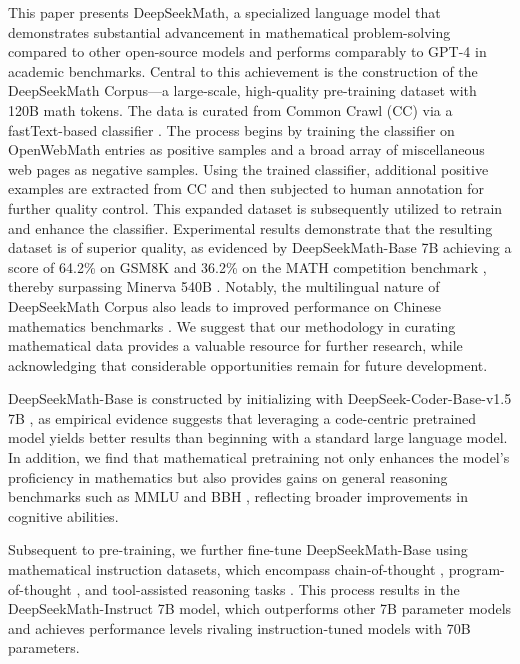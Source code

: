 This paper presents DeepSeekMath, a specialized language model that demonstrates substantial advancement in mathematical problem-solving compared to other open-source models and performs comparably to GPT-4 in academic benchmarks. Central to this achievement is the construction of the DeepSeekMath Corpus—a large-scale, high-quality pre-training dataset with 120B math tokens. The data is curated from Common Crawl (CC) via a fastText-based classifier \citep{joulin2016fasttext}. The process begins by training the classifier on OpenWebMath \citep{openwebmath} entries as positive samples and a broad array of miscellaneous web pages as negative samples. Using the trained classifier, additional positive examples are extracted from CC and then subjected to human annotation for further quality control. This expanded dataset is subsequently utilized to retrain and enhance the classifier. Experimental results demonstrate that the resulting dataset is of superior quality, as evidenced by DeepSeekMath-Base 7B achieving a score of 64.2\% on GSM8K \citep{gsm8k} and 36.2\% on the MATH competition benchmark \citep{MATH}, thereby surpassing Minerva 540B \citep{minerva}. Notably, the multilingual nature of DeepSeekMath Corpus also leads to improved performance on Chinese mathematics benchmarks \citep{wei2023cmath,agieval}. We suggest that our methodology in curating mathematical data provides a valuable resource for further research, while acknowledging that considerable opportunities remain for future development.

DeepSeekMath-Base is constructed by initializing with DeepSeek-Coder-Base-v1.5 7B \citep{deepseek-coder}, as empirical evidence suggests that leveraging a code-centric pretrained model yields better results than beginning with a standard large language model. In addition, we find that mathematical pretraining not only enhances the model’s proficiency in mathematics but also provides gains on general reasoning benchmarks such as MMLU \citep{mmlu} and BBH \citep{bbh}, reflecting broader improvements in cognitive abilities.

Subsequent to pre-training, we further fine-tune DeepSeekMath-Base using mathematical instruction datasets, which encompass chain-of-thought \citep{cot}, program-of-thought \citep{pot,pal}, and tool-assisted reasoning tasks \citep{tora}. This process results in the DeepSeekMath-Instruct 7B model, which outperforms other 7B parameter models and achieves performance levels rivaling instruction-tuned models with 70B parameters.

